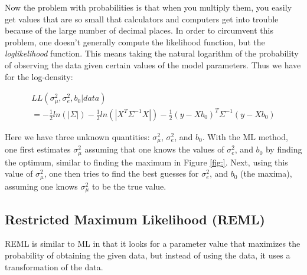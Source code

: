 Now the problem with probabilities is that when you multiply them, you easily get values that are so small that calculators and computers get into trouble because of the large number of decimal places. In order to circumvent this problem, one doesn't generally compute the likelihood function, but the \textit{loglikelihood} function. This means taking the natural logarithm of the probability of observing the data given certain values of the model parameters. Thus we have for the log-density:


\begin{eqnarray}
LL(\sigma_\mu^2, \sigma^2_e, b_0|data) \nonumber\\
=
-\frac{1}{2} ln(|\Sigma|)  
-\frac{1}{2}ln(|X^{T}\Sigma^{-1}X|) 
-\frac{1}{2}  (y-Xb_0)^{T}  \Sigma^{-1}  (y-Xb_0)
\end{eqnarray}

Here we have three unknown quantities: $\sigma_\mu^2$, $\sigma^2_e$, and $b_0$. With the ML method, one first estimates $\sigma_\mu^2$ assuming that one knows the values of $\sigma^2_e$, and $b_0$ by finding the optimum, similar to finding the maximum in Figure \ref{fig:}. Next, using this value of $\sigma_\mu^2$, one then tries to find the best guesses for $\sigma^2_e$, and $b_0$ (the maxima), assuming one knows $\sigma_\mu^2$ to be the true value. 








\subsection{Restricted Maximum Likelihood (REML)}
%
REML is similar to ML in that it looks for a parameter value that maximizes the probability of obtaining the given data, but instead of using the data, it uses a transformation of the data.
%
%
%
%
%

